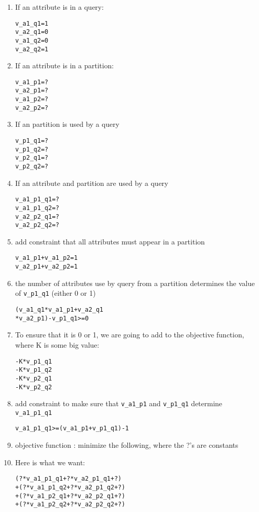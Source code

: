 \documentclass[twocolumn]{svjour3}          %
\begin{document}
\begin{enumerate}

   \item If an attribute is in a query:
\begin{alltt}
    v_a1_q1 = 1
    v_a2_q1 = 0
    v_a1_q2 = 0
    v_a2_q2 = 1
\end{alltt}


   \item If an attribute is in a partition:
\begin{alltt}
    v_a1_p1 = ?
    v_a2_p1 = ?
    v_a1_p2 = ?
    v_a2_p2 = ?
\end{alltt}

  
 \item If an partition is used by a query

\begin{alltt}
    v_p1_q1 = ?
    v_p1_q2 = ?
    v_p2_q1 = ?
    v_p2_q2 = ?
\end{alltt}


   \item If an attribute and partition are used by a query
\begin{alltt} 
   v_a1_p1_q1 = ?
    v_a1_p1_q2 = ?
    v_a2_p2_q1 = ?
    v_a2_p2_q2 = ?
\end{alltt}

    \item add constraint that all attributes must appear in a partition
\begin{alltt}
    v_a1_p1 + v_a1_p2  = 1
    v_a2_p1 + v_a2_p2 = 1
\end{alltt}


    \item the number of attributes use by query from a partition determines the
      value of \texttt{v\_p1\_q1} (either 0 or 1)
\begin{alltt}
    (v_a1_q1 * v_a1_p1 + v_a2_q1 
   * v_a2_p1) - v_p1_q1 >= 0
\end{alltt}

    \item To ensure that it is 0 or 1, we are going to add to the objective function, where K is some big value:
\begin{alltt}
   - K * v_p1_q1
   - K * v_p1_q2
   - K * v_p2_q1 
   - K * v_p2_q2
\end{alltt}


    \item add constraint to make sure that \texttt{v\_a1\_p1} and \texttt{v\_p1\_q1} determine
      \texttt{v\_a1\_p1\_q1}
\begin{alltt}
    v_a1_p1_q1 >= (v_a1_p1 + v_p1_q1) -1
\end{alltt}


    \item objective function : minimize the following, where the ?'s are constants

   \item Here is what we want:
\begin{alltt}
   (? * v_a1_p1_q1 + ? * v_a2_p1_q1 + ?)
  + (? * v_a1_p1_q2 + ? * v_a2_p1_q2 + ?)
  + (? * v_a1_p2_q1 + ? * v_a2_p2_q1 + ?)
  + (? * v_a1_p2_q2 + ? * v_a2_p2_q2 + ?)
\end{alltt}
\end{enumerate}



 
\end{document}
